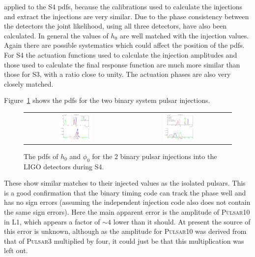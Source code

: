 applied to the S4 pdfs, because the calibrations used to calculate the injections and extract the
injections are very similar. 
Due to the phase consistency between the detectors the joint likelihood, using all three detectors,
have also been calculated. In general the values of $h_0$ are well matched with the injection
values. Again there are possible systematics which could affect the position of the pdfs. For S4 the
actuation functions used to calculate the injection amplitudes and those used to calculate the final
response function are much more similar than those for S3, with a ratio close to unity. The
actuation phases are also very closely matched.

Figure~\ref{S4BinPulsarInj} shows the pdfs for the two binary system pulsar injections.
\begin{figure}[!htbp]
\begin{longtable}{c c}
\includegraphics[width=0.33\textwidth]{figs/S4PULSAR10} &
\includegraphics[width=0.33\textwidth]{figs/S4PULSAR11} \\
\end{longtable}
\caption{The pdfs of $h_0$ and $\phi_0$ for the 2 binary pulsar injections into the LIGO
detectors during S4.}\label{S4BinPulsarInj}
\end{figure}
These show similar matches to their injected values as the isolated pulsars. This is a good
confirmation that the binary timing code can track the phase well and has no sign errors (assuming
the independent injection code also does not contain the same sign errors). Here the main apparent
error is the amplitude of P\textsc{ulsar}10 in L1, which appears a factor of $\sim 4$ lower than it
should. At present the source of this error is unknown, although as the amplitude for
P\textsc{ulsar}10 was derived from that of P\textsc{ulsar}3 multiplied by four, it could just be
that this multiplication was left out.

